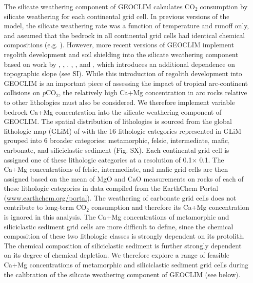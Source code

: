 \documentclass[11pt,letterpaper]{article}
\newcommand{\degrees}{\textdegree\xspace}
\newcommand{\pCOtwo}{\textit{p}CO$_{2}$\xspace}
\newcommand{\COtwo}{CO$_{2}$\xspace}
\begin{document}
The silicate weathering component of GEOCLIM calculates \COtwo consumption by silicate weathering for each continental grid cell. In previous versions of the model, the silicate weathering rate was a function of temperature and runoff only, and assumed that the bedrock in all continental grid cells had identical chemical compositions (e.g. \citealp{Godderis2014a}). However, more recent versions of GEOCLIM implement regolith development and soil shielding into the silicate weathering component based on work by \citet{Heimsath1997a}, \citet{Gabet2009a}, \citet{West2012a}, \citet{Carretier2014a}, \citet{Godderis2017b}, and \citet{Maffre2018a}, which introduces an additional dependence on topographic slope (see SI). While this introduction of regolith development into GEOCLIM is an important piece of assessing the impact of tropical arc-continent collisions on \pCOtwo, the relatively high Ca+Mg concentration in arc rocks relative to other lithologies must also be considered. We therefore implement variable bedrock Ca+Mg concentration into the silicate weathering component of GEOCLIM. The spatial distribution of lithologies is sourced from the global lithologic map (GLiM) of \citet{Hartmann2012a} with the 16 lithologic categories represented in GLiM grouped into 6 broader categories: metamorphic, felsic, intermediate, mafic, carbonate, and siliciclastic sediment (Fig. SX). Each continental grid cell is assigned one of these lithologic categories at a resolution of 0.1\degrees $\times$ 0.1\degrees. The Ca+Mg concentrations of felsic, intermediate, and mafic grid cells are then assigned based on the mean of MgO and CaO measurements on rocks of each of these lithologic categories in data compiled from the EarthChem Portal (\url{www.earthchem.org/portal}). The weathering of carbonate grid cells does not contribute to long-term \COtwo consumption and therefore its Ca+Mg concentration is ignored in this analysis. The Ca+Mg concentrations of metamorphic and siliciclastic sediment grid cells are more difficult to define, since the chemical composition of these two lithologic classes is strongly dependent on its protolith. The chemical composition of siliciclastic sediment is further strongly dependent on its degree of chemical depletion. We therefore explore a range of feasible Ca+Mg concentrations of metamorphic and siliciclastic sediment grid cells during the calibration of the silicate weathering component of GEOCLIM (see below).
\end{document}

